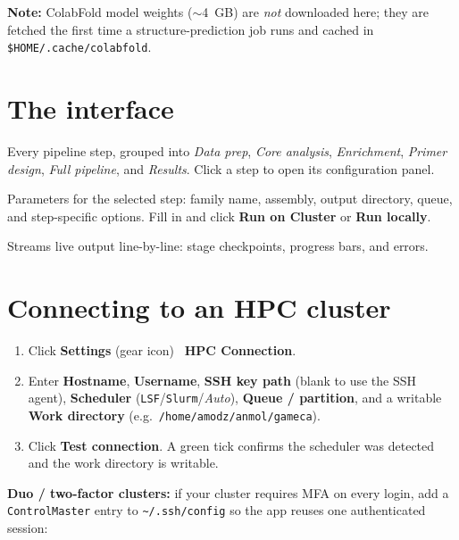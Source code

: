 \documentclass[11pt]{article}
\begin{document}
\noindent\textbf{Note:} ColabFold model weights ($\sim$4~GB) are
\emph{not} downloaded here; they are fetched the first time a
structure-prediction job runs and cached in
\texttt{\$HOME/.cache/colabfold}.

\section{The interface}

\begin{description}[leftmargin=0pt]
  \item[Sidebar (left).] Every pipeline step, grouped into \emph{Data
        prep}, \emph{Core analysis}, \emph{Enrichment}, \emph{Primer
        design}, \emph{Full pipeline}, and \emph{Results}. Click a step
        to open its configuration panel.
  \item[Configuration panel (centre).] Parameters for the selected step:
        family name, assembly, output directory, queue, and step-specific
        options. Fill in and click \textbf{Run on Cluster} or
        \textbf{Run locally}.
  \item[Log panel (bottom).] Streams live output line-by-line: stage
        checkpoints, progress bars, and errors.
\end{description}

\section{Connecting to an HPC cluster}

\begin{enumerate}
  \item Click \textbf{Settings} (gear icon) \textrightarrow\
        \textbf{HPC Connection}.
  \item Enter \textbf{Hostname}, \textbf{Username}, \textbf{SSH key path}
        (blank to use the SSH agent), \textbf{Scheduler}
        (\texttt{LSF}/\texttt{Slurm}/\emph{Auto}),
        \textbf{Queue / partition}, and a writable \textbf{Work
        directory} (e.g.\ \texttt{/home/amodz/anmol/gameca}).
  \item Click \textbf{Test connection}. A green tick confirms the
        scheduler was detected and the work directory is writable.
\end{enumerate}

\noindent\textbf{Duo / two-factor clusters:} if your cluster requires MFA
on every login, add a \texttt{ControlMaster} entry to
\texttt{\textasciitilde/.ssh/config} so the app reuses one authenticated
session:
\end{document}
